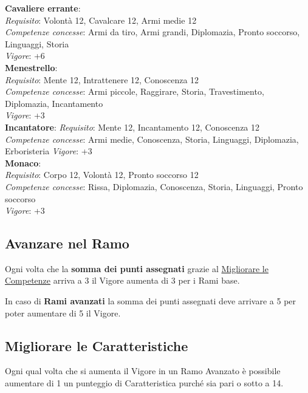 \documentclass[12pt,a4paper,twoside,openany]{book}
\begin{document}
\begin{multicols}{2}
\textbf{Cavaliere errante}:\\
\textit{Requisito}: Volontà 12, Cavalcare 12, Armi medie 12\\
\textit{Competenze concesse}: Armi da tiro, Armi grandi, Diplomazia, Pronto soccorso, Linguaggi, Storia\\
\textit{Vigore}: +6\\

\textbf{Menestrello}:\\
\textit{Requisito}: Mente 12, Intrattenere 12, Conoscenza 12\\
\textit{Competenze concesse}: Armi piccole, Raggirare, Storia, Travestimento, Diplomazia, Incantamento\\
\textit{Vigore}: +3\\

\textbf{Incantatore}:
\textit{Requisito}: Mente 12, Incantamento 12, Conoscenza 12\\
\textit{Competenze concesse}: Armi medie, Conoscenza, Storia, Linguaggi, Diplomazia, Erboristeria 
\textit{Vigore}: +3\\

\textbf{Monaco}:\\
\textit{Requisito}: Corpo 12, Volontà 12, Pronto soccorso 12\\
\textit{Competenze concesse}: Rissa, Diplomazia, Conoscenza, Storia, Linguaggi, Pronto soccorso\\
\textit{Vigore}: +3\\


\subsection{Avanzare nel Ramo}

Ogni volta che la \textbf{somma dei punti assegnati} grazie al \hyperlink{Migliorare le Competenze}{Migliorare le Competenze} arriva a 3 il Vigore aumenta di 3 per i Rami base.

In caso di \textbf{Rami avanzati} la somma dei punti assegnati deve arrivare a 5 per poter aumentare di 5 il Vigore.

\subsection{Migliorare le Caratteristiche}

Ogni qual volta che si aumenta il Vigore in un Ramo Avanzato è possibile aumentare di 1 un punteggio di Caratteristica purché sia pari o sotto a 14.


\end{multicols}
\end{document}
